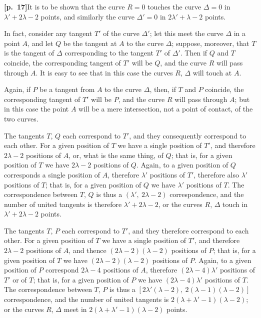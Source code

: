 \documentclass[11pt,a4paper]{article}
\begin{document}
\bigskip

\noindent\textbf{[p.~17]}\quad It is to be shown that the curve $R = 0$ touches the curve $\Delta = 0$ in $\lambda' + 2\lambda - 2$ points, and similarly the curve $\Delta' = 0$ in $2\lambda' + \lambda - 2$ points.

\medskip

In fact, consider any tangent $T'$ of the curve $\Delta'$; let this meet the curve $\Delta$ in a point $A$, and let $Q$ be the tangent at $A$ to the curve $\Delta$; suppose, moreover, that $T$ is the tangent of $\Delta$ corresponding to the tangent $T'$ of $\Delta'$. Then if $Q$ and $T$ coincide, the corresponding tangent of $T'$ will be $Q$, and the curve $R$ will pass through $A$. It is easy to see that in this case the curves $R$, $\Delta$ will touch at $A$.

\medskip

Again, if $P$ be a tangent from $A$ to the curve $\Delta$, then, if $T$ and $P$ coincide, the corresponding tangent of $T'$ will be $P$, and the curve $R$ will pass through $A$; but in this case the point $A$ will be a mere intersection, not a point of contact, of the two curves.

\medskip

The tangents $T$, $Q$ each correspond to $T'$, and they consequently correspond to each other. For a given position of $T$ we have a single position of $T'$, and therefore $2\lambda - 2$ positions of $A$, or, what is the same thing, of $Q$; that is, for a given position of $T$ we have $2\lambda - 2$ positions of $Q$. Again, to a given position of $Q$ corresponds a single position of $A$, therefore $\lambda'$ positions of $T'$, therefore also $\lambda'$ positions of $T$; that is, for a given position of $Q$ we have $\lambda'$ positions of $T$. The correspondence between $T$, $Q$ is thus a $(\lambda',\ 2\lambda - 2)$ correspondence, and the number of united tangents is therefore $\lambda' + 2\lambda - 2$, or the curves $R$, $\Delta$ touch in $\lambda' + 2\lambda - 2$ points.

\medskip

The tangents $T$, $P$ each correspond to $T'$, and they therefore correspond to each other. For a given position of $T$ we have a single position of $T'$, and therefore $2\lambda - 2$ positions of $A$, and thence $(2\lambda - 2)(\lambda - 2)$ positions of $P$; that is, for a given position of $T$ we have $(2\lambda - 2)(\lambda - 2)$ positions of $P$. Again, to a given position of $P$ correspond $2\lambda - 4$ positions of $A$, therefore $(2\lambda - 4)\lambda'$ positions of $T'$ or of $T$; that is, for a given position of $P$ we have $(2\lambda - 4)\lambda'$ positions of $T$. The correspondence between $T$, $P$ is thus a $[2\lambda'(\lambda - 2),\ 2(\lambda - 1)(\lambda - 2)]$ correspondence, and the number of united tangents is $2(\lambda + \lambda' - 1)(\lambda - 2)$; or the curves $R$, $\Delta$ meet in $2(\lambda + \lambda' - 1)(\lambda - 2)$ points.
\end{document}
